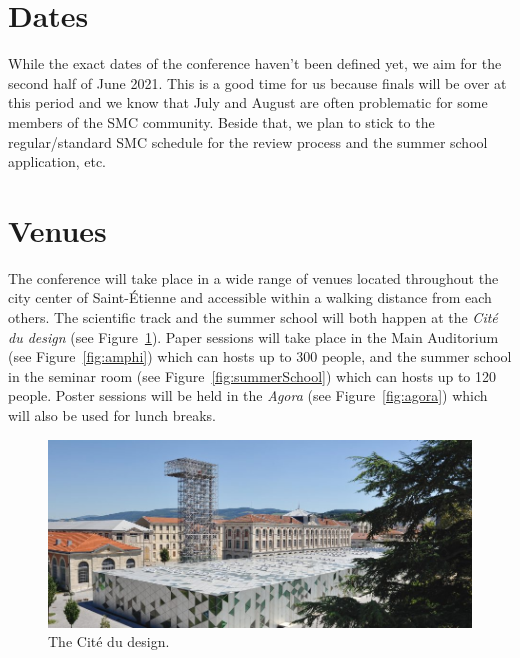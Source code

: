\documentclass[fontsize=12pt]{scrartcl} %
\numberwithin{equation}{section} %
\numberwithin{figure}{section} %
\numberwithin{table}{section} %
\begin{document}
\section{Dates}

While the exact dates of the conference haven't been defined yet, we aim for the second half of June 2021. This is a good time for us because finals will be over at this period and we know that July and August are often problematic for some members of the SMC community. Beside that, we plan to stick to the regular/standard SMC schedule for the review process and the summer school application, etc.

\section{Venues}
\label{sec:venues}

The conference will take place in a wide range of venues located throughout the city center of Saint-Étienne and accessible within a walking distance from each others. The scientific track and the summer school will both happen at the \textit{Cité du design} (see Figure~\ref{fig:cite}). Paper sessions will take place in the Main Auditorium (see Figure~\ref{fig:amphi}) which can hosts up to 300 people, and the summer school in the seminar room (see Figure~\ref{fig:summerSchool}) which can hosts up to 120 people. Poster sessions will be held in the \textit{Agora} (see Figure~\ref{fig:agora}) which will also be used for lunch breaks.

\begin{figure}[htpb]
\begin{center}
\includegraphics[width=\columnwidth{}]{img/cite.jpg}
\caption{The Cité du design.}
\label{fig:cite}
\end{center}
\end{figure}
\end{document}
